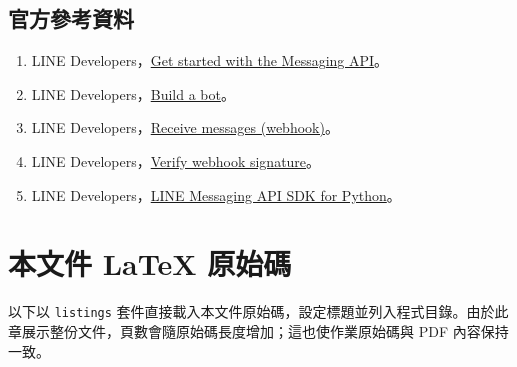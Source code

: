 \documentclass[12pt,a4paper]{report}
\begin{document}
\section*{官方參考資料}
\begin{enumerate}
  \item LINE Developers，\href{https://developers.line.biz/en/docs/messaging-api/getting-started/}{Get started with the Messaging API}。
  \item LINE Developers，\href{https://developers.line.biz/en/docs/messaging-api/building-bot/}{Build a bot}。
  \item LINE Developers，\href{https://developers.line.biz/en/docs/messaging-api/receiving-messages/}{Receive messages (webhook)}。
  \item LINE Developers，\href{https://developers.line.biz/en/docs/messaging-api/verify-webhook-signature/}{Verify webhook signature}。
  \item LINE Developers，\href{https://github.com/line/line-bot-sdk-python}{LINE Messaging API SDK for Python}。
\end{enumerate}

\chapter{本文件 LaTeX 原始碼}
以下以 \texttt{listings} 套件直接載入本文件原始碼，設定標題並列入程式目錄。由於此章展示整份文件，頁數會隨原始碼長度增加；這也使作業原始碼與 PDF 內容保持一致。

\end{document}
